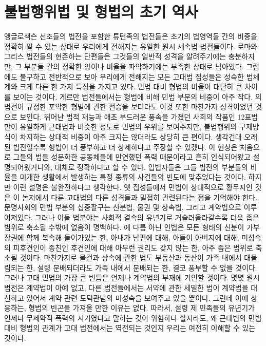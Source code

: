 \chapter{불법행위법 및 형법의 초기 역사}

앵글로색슨 선조들의 법전을 포함한
튜턴족의 법전들은
초기의 법영역들 간의 비중을 정확히 알 수 있는 상태로
우리에게 전해지는
유일한 원시 세속법 법전들이다.
로마와 그리스 법전들의 현존하는 단편들은
그것들의 일반적 성격을 알려주기에는 충분하지만,
그 부분들 간의 정확한 양이나 비율을 파악하기에는 부족한 상태로 남아있다.
그럼에도 불구하고 전반적으로 보아
우리에게 전해지는 모든 고대법 집성들은
성숙한 법체계와 크게 다른 한 가지 특징을 가지고 있다.
민법 대비 형법의 비율이 대단히 큰 차이를 보이는 것이다.
게르만 법전들에서는 형법에 비해 민법 부분의 비중이 아주 작다.
의 법전이 규정한 포악한 형벌에 관한 전승을 보더라도
이것 또한 마찬가지 성격이었던 것으로 보인다.
뛰어난 법적 재능과 애초 부드러운 풍속을 가졌던 사회의 작품인
12표법만이 유일하게
근대법과 비슷한 정도로 민법의 우위를 보여주지만,
불법행위의 구제방식이 차지하는 상대적 비중이
아주 크지는 않더라도 상당히 큰 편이다.
생각건대
오래된 법전일수록 형법이 더 풍부하고 더 상세하다고
주장할 수 있겠다.
이 현상은
처음으로 그들의 법을 성문화한 공동체들에 만연했던 폭력 때문이라고
흔히
인식되어왔고 설명되어왔거니와,
대체로 정확하다고 할 수 있다.
입법자들은
그들 법전의 부분들의 비율을
미개한 생활에서 발생하는 특정 종류의 사건들의 빈도에 맞추었다는 것이다.
하지만
이런 설명은 불완전하다고 생각한다.
옛 집성들에서 민법이 상대적으로 황무지인 것은
이 논저에서 다룬 고대법의 다른 성격들과 밀접히 관련된다는 점을 기억해야 한다.
문명사회의 민법 부분의 십중팔구는
신분법, 물권 및 상속법, 그리고 계약법으로 이루어져있다.
그러나
이들 법분야는
사회적 결속의 유년기로 거슬러올라갈수록
더욱 좁은 범위로 축소될 수밖에 없음이 명백하다.
에 다름 아닌 인법은
모든 형태의 신분이 가부장권에 함께 복속해 들어가있는 한,
아내가 남편에 대해,
아들이 아버지에 대해,
미성숙의 피후견인이 종친인 후견인에 대해
아무런 권리도 갖지 않는 한,
아주 좁은 범위로 축소될 것이다.
마찬가지로
물건과 상속에 관한 법도
부동산과 동산이 가족 내에서 대물림되는 한,
설령 분배되더라도 가족 내에서 분배되는 한,
결코 풍부할 수 없을 것이다.
그러나 고대 민법의 가장 큰 빈틈은
언제나 계약법의 부재에 기인할 것이다.
몇몇 원시 법전은 계약법이 아예 없고,
다른 법전들에서는
서약에 관한 세밀한 법이 계약법을 대신하고 있어서
계약 관련
도덕관념의 미성숙을 보여주고 있을 뿐이다.
그런데 이에 상응하는,
형법의 빈곤을 가져올 만한 이유는 없다.
따라서,
설령 제 민족들의 유년기가 언제나 무제약적 폭력의 시기였다고 말하는 것이
위험하다 할지라도,
왜 근대법의 민법 대비 형법의 관계가 고대 법전에서는 역전되는 것인지
우리는 여전히 이해할 수 있는 것이다.

